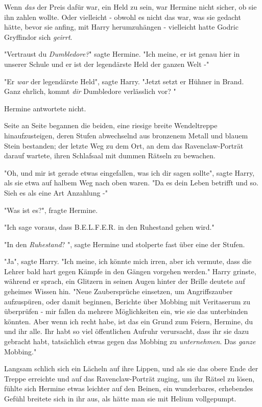 {Wenn \emph{das} der Preis dafür war, ein Held zu sein, war Hermine nicht sicher, ob sie ihn zahlen wollte. Oder vielleicht - obwohl es nicht das war, was sie gedacht hätte, bevor sie anfing, mit Harry herumzuhängen - vielleicht hatte Godric Gryffindor sich \emph{geirrt}.

"Vertraust du \emph{Dumbledore?}" sagte Hermine. "Ich meine, er ist genau hier in unserer Schule und er ist der legendärste Held der ganzen Welt -"

"Er \emph{war} der legendärste Held", sagte Harry. "Jetzt setzt er Hühner in Brand. Ganz ehrlich, kommt \emph{dir} Dumbledore verlässlich vor? "

Hermine antwortete nicht.

Seite an Seite begannen die beiden, eine riesige breite Wendeltreppe hinaufzusteigen, deren Stufen abwechselnd aus bronzenem Metall und blauem Stein bestanden; der letzte Weg zu dem Ort, an dem das Ravenclaw-Porträt darauf wartete, ihren Schlafsaal mit dummen Rätseln zu bewachen.

"Oh, und mir ist gerade etwas eingefallen, was ich dir sagen sollte", sagte Harry, als sie etwa auf halbem Weg nach oben waren. "Da es dein Leben betrifft und so. Sieh es als eine Art Anzahlung -"

"Was ist es?", fragte Hermine.

"Ich sage voraus, dass B.E.L.F.E.R. in den Ruhestand gehen wird."

"In den \emph{Ruhestand}? ", sagte Hermine und stolperte fast über eine der Stufen.

"Ja", sagte Harry. "Ich meine, ich könnte mich irren, aber ich vermute, dass die Lehrer bald hart gegen Kämpfe in den Gängen vorgehen werden." Harry grinste, während er sprach, ein Glitzern in seinen Augen hinter der Brille deutete auf geheimes Wissen hin. "Neue Zaubersprüche einsetzen, um Angriffszauber aufzuspüren, oder damit beginnen, Berichte über Mobbing mit Veritaserum zu überprüfen - mir fallen da mehrere Möglichkeiten ein, wie sie das unterbinden könnten. Aber wenn ich recht habe, ist das ein Grund zum Feiern, Hermine, du und ihr alle. Ihr habt so viel öffentlichen Aufruhr verursacht, dass ihr sie dazu gebracht habt, tatsächlich etwas gegen das Mobbing zu \emph{unternehmen}. Das \emph{ganze} Mobbing."

Langsam schlich sich ein Lächeln auf ihre Lippen, und als sie das obere Ende der Treppe erreichte und auf das Ravenclaw-Porträt zuging, um ihr Rätsel zu lösen, fühlte sich Hermine etwas leichter auf den Beinen, ein wunderbares, erhebendes Gefühl breitete sich in ihr aus, als hätte man sie mit Helium vollgepumpt.

}
